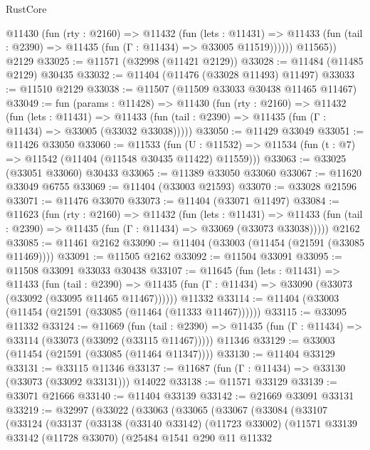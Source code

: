 \begin{lexlean}{RustCore}
\begin{coremodule}
          @11430
            (fun (rty : @2160) =>
            @11432
              (fun (lets : @11431) =>
              @11433 (fun (tail : @2390) => @11435 (fun (Γ : @11434) => @33005 @11519))))))
        @11565))
    @2129
@33025 := @11571 (@32998 (@11421 @2129))
@33028 := @11484 (@11485 @2129) @30435
@33032 := @11404 (@11476 (@33028 @11493) @11497)
@33033 := @11510 @2129
@33038 := @11507 (@11509 @33033 @30438 @11465 @11467)
@33049 := fun (params : @11428) =>
  @11430
    (fun (rty : @2160) =>
    @11432
      (fun (lets : @11431) =>
      @11433 (fun (tail : @2390) => @11435 (fun (Γ : @11434) => @33005 (@33032 @33038)))))
@33050 := @11429 @33049
@33051 := @11426 @33050
@33060 := @11533
    (fun (U : @11532) => @11534 (fun (t : @7) => @11542 (@11404 (@11548 @30435 @11422) @11559)))
@33063 := @33025 (@33051 @33060) @30433
@33065 := @11389 @33050 @33060
@33067 := @11620 @33049 @6755
@33069 := @11404 (@33003 @21593)
@33070 := @33028 @21596
@33071 := @11476 @33070
@33073 := @11404 (@33071 @11497)
@33084 := @11623
    (fun (rty : @2160) =>
    @11432
      (fun (lets : @11431) =>
      @11433 (fun (tail : @2390) => @11435 (fun (Γ : @11434) => @33069 (@33073 @33038)))))
    @2162
@33085 := @11461 @2162
@33090 := @11404 (@33003 (@11454 (@21591 (@33085 @11469))))
@33091 := @11505 @2162
@33092 := @11504 @33091
@33095 := @11508 @33091 @33033 @30438
@33107 := @11645
    (fun (lets : @11431) =>
    @11433
      (fun (tail : @2390) =>
      @11435 (fun (Γ : @11434) => @33090 (@33073 (@33092 (@33095 @11465 @11467))))))
    @11332
@33114 := @11404 (@33003 (@11454 (@21591 (@33085 (@11464 (@11333 @11467))))))
@33115 := @33095 @11332
@33124 := @11669
    (fun (tail : @2390) => @11435 (fun (Γ : @11434) => @33114 (@33073 (@33092 (@33115 @11467)))))
    @11346
@33129 := @33003 (@11454 (@21591 (@33085 (@11464 @11347))))
@33130 := @11404 @33129
@33131 := @33115 @11346
@33137 := @11687 (fun (Γ : @11434) => @33130 (@33073 (@33092 @33131))) @14022
@33138 := @11571 @33129
@33139 := @33071 @21666
@33140 := @11404 @33139
@33142 := @21669 @33091 @33131
@33219 := @32997
    (@33022
      (@33063
        (@33065
          (@33067
            (@33084
              (@33107
                (@33124
                  (@33137
                    (@33138
                      (@33140 @33142)
                      (@11723 @33002)
                      (@11571
                        @33139
                        @33142
                        (@11728 @33070)
                        (@25484
                          @1541
                          @290
                          @11
                          @11332

\end{coremodule}
\end{lexlean}
